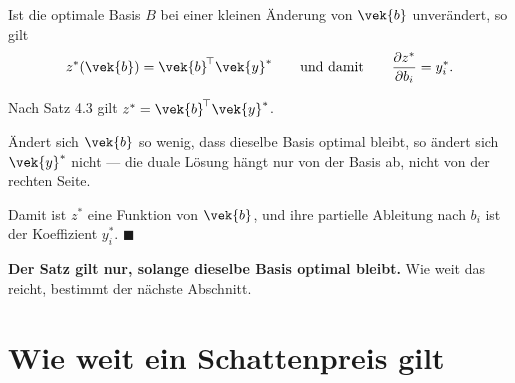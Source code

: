 \begin{merksatz}
Ist die optimale Basis $B$ bei einer kleinen Änderung von $\vek{b}$ unverändert, so gilt
\[ z^{*}(\vek{b}) = \vek{b}^{\!\top}\vek{y}^{*} \qquad\text{und damit}\qquad \frac{\partial z^{*}}{\partial b_i} = y_i^{*} . \]

Nach Satz 4.3 gilt $z^{*} = \vek{b}^{\!\top}\vek{y}^{*}$.

Ändert sich $\vek{b}$ so wenig, dass dieselbe Basis optimal bleibt, so ändert sich $\vek{y}^{*}$ nicht --- die duale Lösung hängt nur von der Basis ab, nicht von der rechten Seite.

\begin{center}
\begin{minipage}{0.88\textwidth}
\end{minipage}
\end{center}

Damit ist $z^{*}$ eine  Funktion von $\vek{b}$, und ihre partielle Ableitung nach $b_i$ ist der Koeffizient $y_i^{*}$. $\blacksquare$

\begin{center}
\begin{minipage}{0.9\textwidth}
\textbf{Der Satz gilt nur, solange dieselbe Basis optimal bleibt.} Wie weit das reicht, bestimmt der nächste Abschnitt.
\end{minipage}
\end{center}
\end{merksatz}

\section{Wie weit ein Schattenpreis gilt}

